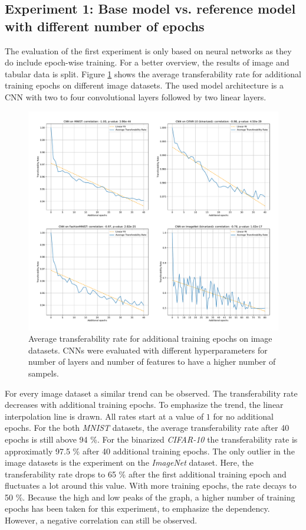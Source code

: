 \documentclass{article}
\begin{document}
\subsection{Experiment 1: Base model vs. reference model with different number of epochs}
The evaluation of the first experiment is only based on neural networks as they do include epoch-wise training. For a better overview, the results of image and tabular data is split. Figure \ref{fig:add_epochs_image} shows the average transferability rate for additional training epochs on different image datasets. The used model architecture is a CNN with two to four convolutional layers followed by two linear layers.\\
\begin{figure}[h]
    \centering
    \includegraphics[width=\linewidth]{abb/epoch_evaluation_image.pdf}    
    \caption{Average transferability rate for additional training epochs on image datasets. CNNs were evaluated with different hyperparameters for number of layers and number of features to have a higher number of sampels.}    
    \label{fig:add_epochs_image}    
\end{figure}
\noindent
For every image dataset a similar trend can be observed. The transferability rate decreases with additional training epochs. To emphasize the trend, the linear interpolation line is drawn. All rates start at a value of $1$ for no additional epochs. For the both \textit{MNIST} datasets, the average transferability rate after 40 epochs is still above 94 \%. For the binarized \textit{CIFAR-10} the transferability rate is approximatly 97.5 \% after 40 additional training epochs. The only outlier in the image datasets is the experiment on the \textit{ImageNet} dataset. Here, the transferability rate drops to 65 \% after the first additional training epoch and fluctuates a lot around this value. With more training epochs, the rate decays to 50 \%. Because the high and low peaks of the graph, a higher number of training epochs has been taken for this experiment, to emphasize the dependency. However, a negative correlation can still be observed.\\
\end{document}
